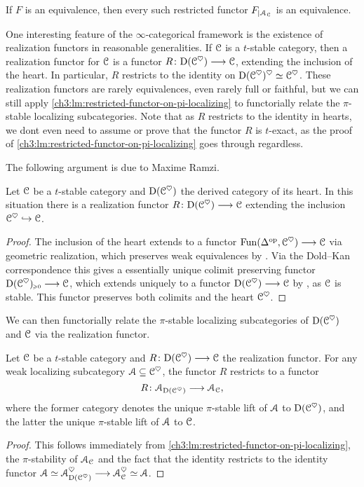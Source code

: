 \begin{corollary}
    If $F$ is an equivalence, then every such restricted functor $F_{\vert \EuScript{A}_{\EuScript{C}}}$ is an equivalence. 
\end{corollary}

One interesting feature of the $\infty$-categorical framework is the existence of realization functors in reasonable generalities. If $\EuScript{C}$ is a $t$-stable category, then a realization functor for $\EuScript{C}$ is a functor $R\colon\mathrm{D}(\EuScript{C}^{\heartsuit})\longrightarrow \EuScript{C}$, extending the inclusion of the heart. In particular, $R$ restricts to the identity on $\mathrm{D}(\EuScript{C}^\heartsuit)^\heartsuit\simeq \EuScript{C}^\heartsuit$. These realization functors are rarely equivalences, even rarely full or faithful, but we can still apply \cref{ch3:lm:restricted-functor-on-pi-localizing} to functorially relate the $\pi$-stable localizing subcategories. Note that as $R$ restricts to the identity in hearts, we dont even need to assume or prove that the functor $R$ is $t$-exact, as the proof of \cref{ch3:lm:restricted-functor-on-pi-localizing} goes through regardless.  

The following argument is due to Maxime Ramzi.

\begin{lemma}
    Let $\EuScript{C}$ be a $t$-stable category and $\mathrm{D}(\EuScript{C}^\heartsuit)$ the derived category of its heart. In this situation there is a realization functor $R\colon\mathrm{D}(\EuScript{C}^{\heartsuit})\longrightarrow \EuScript{C}$ extending the inclusion $\EuScript{C}^\heartsuit\hookrightarrow \EuScript{C}$. 
\end{lemma}
\begin{proof}
     The inclusion of the heart extends to a functor $\operatorname{Fun}(\Delta^{\mathrm{op}}, \EuScript{C}^\heartsuit)\longrightarrow \EuScript{C}$ via geometric realization, which preserves weak equivalences by \cite[1.2.4.4, 1.2.4.5]{Lurie_HA}. Via the Dold--Kan correspondence this gives a essentially unique colimit preserving functor $\mathrm{D}(\EuScript{C}^\heartsuit)_{\hspace{-1pt}\scriptscriptstyle\geqslant 0}\longrightarrow \EuScript{C}$, which extends uniquely to a functor $\mathrm{D}(\EuScript{C}^\heartsuit)\longrightarrow \EuScript{C}$ by \cite[1.4.4.5]{Lurie_HA}, as $\EuScript{C}$ is stable. This functor preserves both colimits and the heart $\EuScript{C}^\heartsuit$. 
\end{proof}

We can then functorially relate the $\pi$-stable localizing subcategories of $\mathrm{D}(\EuScript{C}^\heartsuit)$ and $\EuScript{C}$ via the realization functor. 

\begin{corollary}
    Let $\EuScript{C}$ be a $t$-stable category and $R\colon \mathrm{D}(\EuScript{C}^\heartsuit)\longrightarrow \EuScript{C}$ the realization functor. For any weak localizing subcategory $\EuScript{A}\subseteq \EuScript{C}^\heartsuit$, the functor $R$ restricts to a functor
    \[R\colon \EuScript{A}_{\mathrm{D}(\EuScript{C}^\heartsuit)}\longrightarrow \EuScript{A}_{\EuScript{C}},\]
    where the former category denotes the unique $\pi$-stable lift of $\EuScript{A}$ to $\mathrm{D}(\EuScript{C}^\heartsuit)$, and the latter the unique $\pi$-stable lift of $\EuScript{A}$ to $\EuScript{C}$. 
\end{corollary}
\begin{proof}
    This follows immediately from \cref{ch3:lm:restricted-functor-on-pi-localizing}, the $\pi$-stability of $\EuScript{A}_{\EuScript{C}}$ and the fact that the identity restricts to the identity functor $\EuScript{A}\simeq\EuScript{A}_{\mathrm{D}(\EuScript{C}^\heartsuit)}^\heartsuit \longrightarrow \EuScript{A}_{\EuScript{C}}^\heartsuit\simeq \EuScript{A}$. 
\end{proof}

